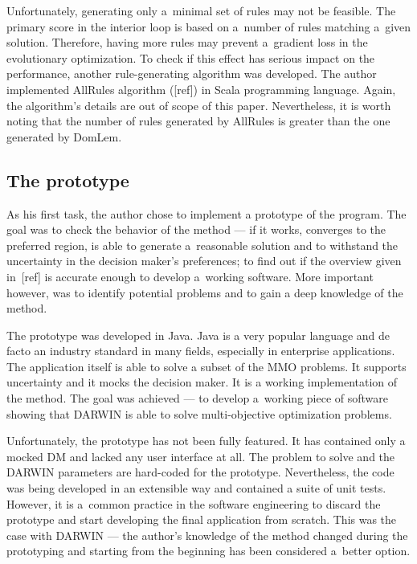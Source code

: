 Unfortunately, generating only a~minimal set of rules may not be feasible. The
primary score in the interior loop is based on a~number of rules matching
a~given solution. Therefore, having more rules may prevent a~gradient loss in
the evolutionary optimization. To check if this effect has serious impact on
the performance, another rule-generating algorithm was developed. The author
implemented AllRules algorithm ([ref]) in Scala programming language. Again,
the algorithm's details are out of scope of this paper. Nevertheless, it is
worth noting that the number of rules generated by AllRules is greater than
the one generated by DomLem.

\subsection{The prototype}

As his first task, the author chose to implement a prototype of the
program. The goal was to check the behavior of the method --- if it works,
converges to the preferred region, is able to generate a~reasonable solution
and to withstand the uncertainty in the decision maker's preferences; to find
out if the overview given in~[ref] is accurate enough to develop a~working
software. More important however, was to identify potential problems and to
gain a deep knowledge of the method.

The prototype was developed in Java. Java is a very popular language and de
facto an industry standard in many fields, especially in enterprise
applications. The application itself is able to solve a subset of the MMO
problems. It supports uncertainty and it mocks the decision maker. It is a
working implementation of the method. The goal was achieved --- to develop
a~working piece of software showing that DARWIN is able to solve
multi-objective optimization problems. 

Unfortunately, the prototype has not been fully featured. It has contained
only a mocked DM and lacked any user interface at all. The problem to solve
and the DARWIN parameters are hard-coded for the prototype. Nevertheless, the
code was being developed in an extensible way and contained a suite of unit
tests. However, it is a~common practice in the software engineering to discard
the prototype and start developing the final application from scratch.  This
was the case with DARWIN --- the author's knowledge of the method changed
during the prototyping and starting from the beginning has been considered
a~better option.

